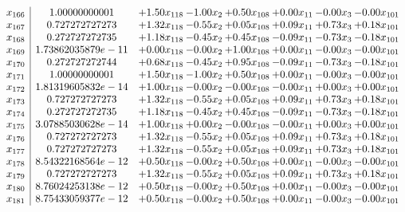 \documentclass[8pt]{article}
\begin{document}
\[\begin{array}{c| c c@{\hskip 2pt} c@{\hskip 2pt} c@{\hskip 2pt} c@{\hskip 2pt} c@{\hskip 2pt} c@{\hskip 2pt} }
 x_{166}   &  1.00000000001 & +  1.50 x_{118} & -1.00 x_{2} & +  0.50 x_{108} & +  0.00 x_{11} & -0.00 x_{3} & -0.00 x_{101}\\
 x_{167}   &  0.727272727273 & +  1.32 x_{118} & -0.55 x_{2} & +  0.05 x_{108} & +  0.09 x_{11} & +  0.73 x_{3} & +  0.18 x_{101}\\
 x_{168}   &  0.272727272735 & +  1.18 x_{118} & -0.45 x_{2} & +  0.45 x_{108} & -0.09 x_{11} & -0.73 x_{3} & -0.18 x_{101}\\
 x_{169}   &  1.73862035879e-11 & +  0.00 x_{118} & -0.00 x_{2} & +  1.00 x_{108} & +  0.00 x_{11} & -0.00 x_{3} & -0.00 x_{101}\\
 x_{170}   &  0.272727272744 & +  0.68 x_{118} & -0.45 x_{2} & +  0.95 x_{108} & -0.09 x_{11} & -0.73 x_{3} & -0.18 x_{101}\\
 x_{171}   &  1.00000000001 & +  1.50 x_{118} & -1.00 x_{2} & +  0.50 x_{108} & +  0.00 x_{11} & -0.00 x_{3} & -0.00 x_{101}\\
 x_{172}   &  1.81319605832e-14 & +  1.00 x_{118} & -0.00 x_{2} & -0.00 x_{108} & -0.00 x_{11} & +  0.00 x_{3} & +  0.00 x_{101}\\
 x_{173}   &  0.727272727273 & +  1.32 x_{118} & -0.55 x_{2} & +  0.05 x_{108} & +  0.09 x_{11} & +  0.73 x_{3} & +  0.18 x_{101}\\
 x_{174}   &  0.272727272735 & +  1.18 x_{118} & -0.45 x_{2} & +  0.45 x_{108} & -0.09 x_{11} & -0.73 x_{3} & -0.18 x_{101}\\
 x_{175}   &  3.07885030628e-14 & +  1.00 x_{118} & +  0.00 x_{2} & -0.00 x_{108} & -0.00 x_{11} & +  0.00 x_{3} & +  0.00 x_{101}\\
 x_{176}   &  0.727272727273 & +  1.32 x_{118} & -0.55 x_{2} & +  0.05 x_{108} & +  0.09 x_{11} & +  0.73 x_{3} & +  0.18 x_{101}\\
 x_{177}   &  0.727272727273 & +  1.32 x_{118} & -0.55 x_{2} & +  0.05 x_{108} & +  0.09 x_{11} & +  0.73 x_{3} & +  0.18 x_{101}\\
 x_{178}   &  8.54322168564e-12 & +  0.50 x_{118} & -0.00 x_{2} & +  0.50 x_{108} & +  0.00 x_{11} & -0.00 x_{3} & -0.00 x_{101}\\
 x_{179}   &  0.727272727273 & +  1.32 x_{118} & -0.55 x_{2} & +  0.05 x_{108} & +  0.09 x_{11} & +  0.73 x_{3} & +  0.18 x_{101}\\
 x_{180}   &  8.76024253138e-12 & +  0.50 x_{118} & -0.00 x_{2} & +  0.50 x_{108} & +  0.00 x_{11} & -0.00 x_{3} & -0.00 x_{101}\\
 x_{181}   &  8.75433059377e-12 & +  0.50 x_{118} & -0.00 x_{2} & +  0.50 x_{108} & +  0.00 x_{11} & -0.00 x_{3} & -0.00 x_{101}\\

\end{array}\]
\end{document}
